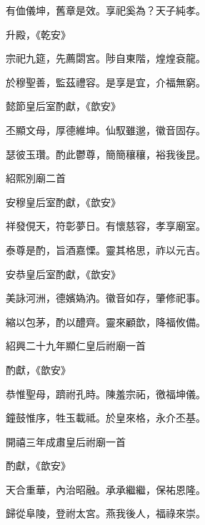\begin{pinyinscope}
 有侐儀坤，舊章是效。享祀奚為？天子純孝。



 升殿，《乾安》



 宗祀九筵，先薦閟宮。陟自東階，煌煌袞龍。



 於穆聖善，監茲禮容。是享是宜，介福無窮。



 懿節皇后室酌獻，《歆安》



 丕顯文母，厚德維坤。仙馭雖邈，徽音固存。



 瑟彼玉瓚。酌此鬱尊，簡簡穰穰，裕我後昆。



 紹熙別廟二首



 安穆皇后室酌獻，《歆安》



 祥發俔天，符彰夢日。有懷慈容，孝享廟室。



 泰尊是酌，旨酒嘉慄。靈其格思，祚以元吉。



 安恭皇后室酌獻，《歆安》



 美詠河洲，德嬪媯汭。徽音如存，肇修祀事。



 縮以包茅，酌以醴齊。靈來顧歆，降福攸備。



 紹興二十九年顯仁皇后祔廟一首



 酌獻，《歆安》



 恭惟聖母，躋祔孔時。陳羞宗祏，徼福坤儀。



 鐘鼓惟序，牲玉載祗。於皇來格，永介丕基。



 開禧三年成肅皇后祔廟一首



 酌獻，《歆安》



 天合重華，內治昭融。承承繼繼，保祐恩隆。



 歸從阜陵，登祔太宮。燕我後人，福祿來崇。



\end{pinyinscope}